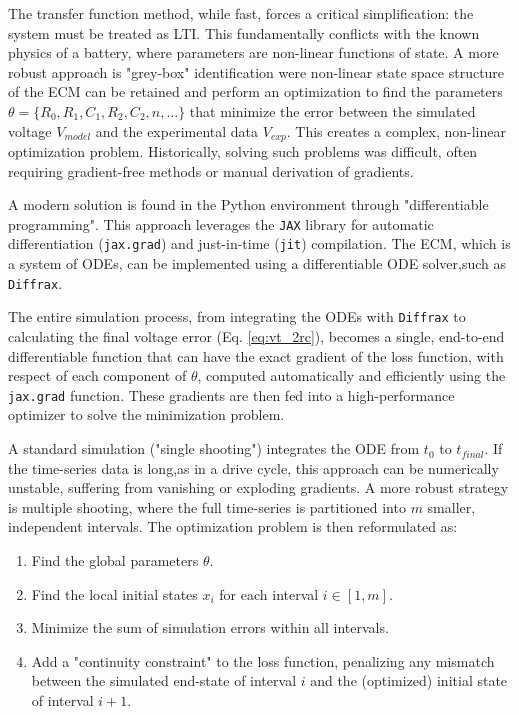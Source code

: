 \documentclass[lettersize,journal]{IEEEtran}
\begin{document}
The transfer function method, while fast, forces a critical simplification: the system must be treated as LTI. This fundamentally conflicts with the known physics of a battery, where parameters are non-linear functions of state\cite{tran2021comprehensive}. A more robust approach is "grey-box" identification were non-linear state space structure of the ECM can be retained and perform an optimization to find the parameters $\theta = \{R_0, R_1, C_1, R_2, C_2,n, \dots\}$ that minimize the error between the simulated voltage $V_{model}$ and the experimental data $V_{exp}$. This creates a complex, non-linear optimization problem. Historically, solving such problems was difficult, often requiring gradient-free methods or manual derivation of gradients.

A modern solution is found in the Python environment through "differentiable programming". This approach leverages the \texttt{JAX} library for automatic differentiation (\texttt{jax.grad}) and just-in-time (\texttt{jit}) compilation\cite{kidger2021diffrax}. The ECM, which is a system of ODEs, can be implemented using a differentiable ODE solver,such as \texttt{Diffrax}.

The entire simulation process, from integrating the ODEs with \texttt{Diffrax} to calculating the final voltage error (Eq. \ref{eq:vt_2rc}), becomes a single, end-to-end differentiable function that can have the exact gradient of the loss function, with respect of each component of $\theta$, computed automatically and efficiently using the  \texttt{jax.grad} function. These gradients are then fed into a high-performance optimizer to solve the minimization problem.

A standard simulation ("single shooting") integrates the ODE from $t_0$ to $t_{final}$. If the time-series data is long,as in a drive cycle, this approach can be numerically unstable, suffering from vanishing or exploding gradients. A more robust strategy is multiple shooting, where the full time-series is partitioned into $m$ smaller, independent intervals. The optimization problem is then reformulated as:
\begin{enumerate}
	\item Find the global parameters $\theta$.
	\item Find the local initial states $x_i$ for each interval $i \in [1, m]$.
	\item Minimize the sum of simulation errors within all intervals.
	\item Add a "continuity constraint" to the loss function, penalizing any mismatch between the simulated end-state of interval $i$ and the (optimized) initial state of interval $i+1$.
\end{enumerate}
\end{document}

